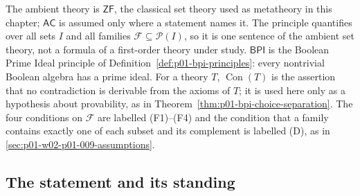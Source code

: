 The ambient theory is \(\mathsf{ZF}\), the classical set theory used as
metatheory in this chapter; \(\mathsf{AC}\) is assumed only where a statement
names it. The principle quantifies over all sets \(I\) and all families
\(\mathcal F\subseteq\mathcal P(I)\), so it is one sentence of the ambient set
theory, not a formula of a first-order theory under study.
\(\mathsf{BPI}\) is the Boolean Prime Ideal principle of
Definition~\ref{def:p01-bpi-principles}: every nontrivial Boolean algebra has
a prime ideal. For a theory \(T\), \(\operatorname{Con}(T)\) is the assertion
that no contradiction is derivable from the axioms of \(T\); it is used here
only as a hypothesis about provability, as in
Theorem~\ref{thm:p01-bpi-choice-separation}. The four conditions on
\(\mathcal F\) are labelled (F1)--(F4) and the condition that a family
contains exactly one of each subset and its complement is labelled (D), as in
\cref{sec:p01-w02-p01-009-assumptions}.

\subsection{The statement and its standing}
\label{sec:p01-w02b-p01-005-statement}

